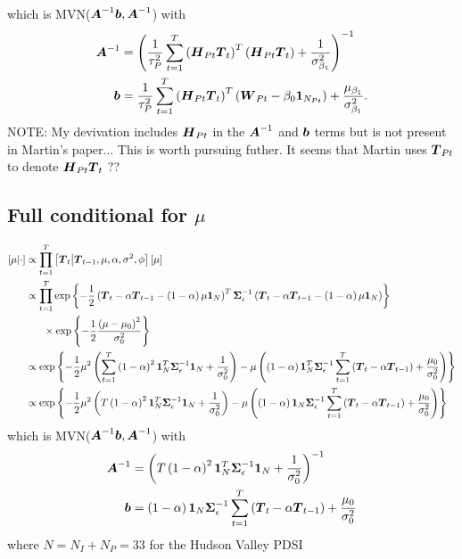 \documentclass{article}\usepackage[]{graphicx}\usepackage[]{color}
\def\bm#1{\mbox{\boldmath $#1$}}
\begin{document}
which is MVN($\bm{A}^{ - 1}\bm{b}, \bm{A}^{ - 1}$) with
%
\begin{align*}
%
\bm{A}^{ - 1} & = \left( \frac{1} {\tau^2_P} \sum_{t = 1}^T \left( \bm{H}_{Pt} \bm{T}_t \right)^T \left( \bm{H}_{Pt} \bm{T}_t \right) + \frac{1} {\sigma^2_{\beta_1}} \right)^{ - 1}\\
%
\bm{b} & = \frac{1} {\tau^2_P} \sum_{t = 1}^T \left( \bm{H}_{Pt} \bm{T}_t \right)^T \left( \bm{W}_{Pt} - \beta_0 \bm{1}_{N_{Pt}} \right) + \frac{\mu_{\beta_1}} {\sigma^2_{\beta_1}}.\\
%
\end{align*}
%
NOTE: My devivation includes $\bm{H}_{Pt}$ in the $\bm{A}^{ - 1}$ and $\bm{b}$ terms but is not present in Martin's paper... This is worth pursuing futher. It seems that Martin uses $\bm{T}_{Pt}$ to denote $\bm{H}_{Pt} \bm{T}_t$ ??
%
%
\subsection{Full conditional for $\mu$}
%
\begin{align*}
%
\left[ \mu \middle| \cdot \right] & \propto \prod_{t = 1}^T \left[ \bm{T}_t \middle| \bm{T}_{t - 1}, \mu, \alpha, \sigma^2, \phi \right] \left[ \mu \right] \\
%
& \propto \prod_{t = 1}^T \exp{ \left\{ - \frac{1} {2} \left( \bm{T}_t  - \alpha \bm{T}_{t - 1} - \left( 1 - \alpha \right) \mu \bm{1}_N \right)^T \bm{\Sigma}_\epsilon^{ - 1} \left( \bm{T}_t  - \alpha \bm{T}_{t - 1} - \left( 1 - \alpha \right) \mu \bm{1}_N \right) \right\} }\\
& \hspace{6mm} \times \exp{ \left\{ - \frac{1} {2} \frac{\left( \mu - \mu_0 \right)^2} {\sigma^2_0} \right\} }\\
%
& \propto \exp{ \left\{ - \frac{1} {2} \mu^2 \left( \sum_{t = 1}^T \left( 1 - \alpha \right)^2 \bm{1}_N^T \bm{\Sigma}_\epsilon^{ - 1} \bm{1}_N + \frac{1} {\sigma^2_0} \right) - \mu \left( \left( 1 - \alpha \right) \bm{1}_N^T \bm{\Sigma}_\epsilon^{ - 1} \sum_{t = 1}^T \left( \bm{T}_t - \alpha \bm{T}_{t - 1} \right) + \frac{\mu_0} {\sigma^2_0} \right) \right\} }\\
%
& \propto \exp{ \left\{ - \frac{1} {2} \mu^2 \left( T \left( 1 - \alpha \right)^2 \bm{1}_N^T \bm{\Sigma}_\epsilon^{ - 1} \bm{1}_N + \frac{1} {\sigma^2_0} \right) - \mu \left( \left( 1 - \alpha \right) \bm{1}_N \bm{\Sigma}_\epsilon^{ - 1} \sum_{t = 1}^T \left( \bm{T}_t - \alpha \bm{T}_{t - 1} \right) + \frac{\mu_0} {\sigma^2_0} \right) \right\} }\\
%
\end{align*}
%
which is MVN($\bm{A}^{ - 1}\bm{b}, \bm{A}^{ - 1}$) with 
%
\begin{align*}
\bm{A}^{ - 1} & = \left( T \left( 1 - \alpha \right)^2 \bm{1}_N^T \bm{\Sigma}_\epsilon^{ - 1} \bm{1}_N + \frac{1} {\sigma^2_0} \right)^{ - 1}\\
%
\bm{b} & = \left( 1 - \alpha \right) \bm{1}_N \bm{\Sigma}_\epsilon^{ - 1} \sum_{t = 1}^T \left( \bm{T}_t - \alpha \bm{T}_{t - 1} \right) + \frac{\mu_0} {\sigma^2_0}\\
%
\end{align*}
%
where $N = N_I + N_P = 33$ for the Hudson Valley PDSI
%
%
\end{document}
